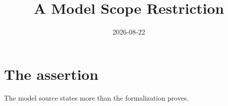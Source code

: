 \documentclass{article}
\title{A Model Scope Restriction}
\author{}
\date{2026-08-22}
\begin{document}
\maketitle
{}

\section{The assertion}
The model source states more than the formalization proves.
\end{document}
